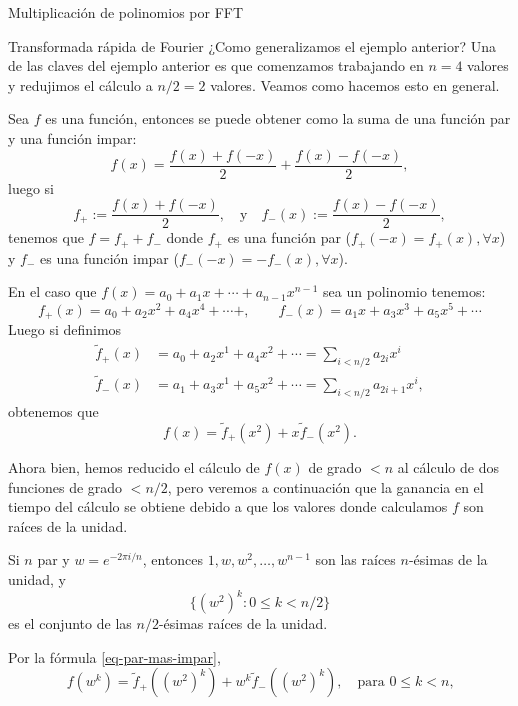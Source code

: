 \begin{chapter}{Multiplicación de polinomios por FFT}
\begin{section}{Transformada rápida de Fourier}
  ¿Como generalizamos el ejemplo anterior? Una de las claves del ejemplo anterior es que comenzamos trabajando en $n=4$ valores y redujimos  el cálculo a $n/2=2$ valores. Veamos como hacemos esto en general.

  Sea  $f$  es una función, entonces se puede obtener como la suma de una función par y una función impar:
  $$
      f(x) = \frac{f(x) + f(-x)}{2} + \frac{f(x) - f(-x)}{2},
  $$
  luego si
  $$
      f_+ := \frac{f(x) + f(-x)}{2}, \quad \text{y} \quad f_-(x):= \frac{f(x) - f(-x)}{2},
  $$
  tenemos que $f = f_+ + f_-$ donde $f_+$ es una función par ($f_+(-x) = f_+(x), \forall x$) y   $f_-$ es una función impar ($f_-(-x) = -f_-(x), \forall x$).

  En  el caso que $f(x)= a_0 + a_1x + \cdots + a_{n-1}x^{n-1}$ sea un polinomio tenemos:
  $$
      f_+(x) = a_0 + a_2 x^2 + a_4 x^4 + \cdots + , \qquad f_-(x) = a_1x + a_3 x^3 + a_5 x^5 + \cdots
  $$
  Luego  si definimos
  \begin{align*}
      \tilde{f}_+(x) & = a_0 + a_2 x^1 + a_4 x^2 + \cdots = \sum_{i<n/2} a_{2i}x^i   \\
      \tilde{f}_-(x) & = a_1 + a_3 x^1 + a_5 x^2 + \cdots= \sum_{i<n/2} a_{2i+1}x^i,
  \end{align*}
  obtenemos que
  \begin{equation}\label{eq-par-mas-impar}
      f(x) = \tilde{f}_+(x^2) + x \tilde{f}_-(x^2).
  \end{equation}

  Ahora bien,  hemos reducido el cálculo de $f(x)$ de grado $<n$ al cálculo de dos funciones de grado $< n/2$, pero veremos a continuación que la ganancia en el tiempo del cálculo se obtiene debido a que los valores donde calculamos $f$ son raíces de la unidad.

  \begin{observacion}\label{obs-raices-unidad-div-2} Si $n$ par y $w = e^{-2\pi i /n}$,  entonces $1, w, w^2,\ldots, w^{n-1}$ son las raíces $n$-ésimas de la unidad,  y
      $$
          \{(w^2)^k: 0 \le k < {n}/{2}\}
      $$
      es el conjunto de las $n/2$-ésimas  raíces de la unidad.
  \end{observacion}

  Por  la fórmula \eqref{eq-par-mas-impar},
  $$
      f(w^k) = \tilde{f}_+((w^2)^k) + w^k \tilde{f}_-((w^2)^k), \quad \text{para $0 \le k < n$,}
  $$


\end{section}
\end{chapter}
